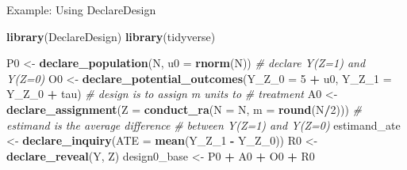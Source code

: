 \documentclass[
  ignorenonframetext,
]{beamer}
\newenvironment{Shaded}{\begin{snugshade}}{\end{snugshade}}
\newcommand{\CommentTok}[1]{\textcolor[rgb]{0.56,0.35,0.01}{\textit{#1}}}
\newcommand{\DataTypeTok}[1]{\textcolor[rgb]{0.13,0.29,0.53}{#1}}
\newcommand{\DecValTok}[1]{\textcolor[rgb]{0.00,0.00,0.81}{#1}}
\newcommand{\KeywordTok}[1]{\textcolor[rgb]{0.13,0.29,0.53}{\textbf{#1}}}
\newcommand{\NormalTok}[1]{#1}
\newcommand{\OperatorTok}[1]{\textcolor[rgb]{0.81,0.36,0.00}{\textbf{#1}}}
\newcommand{\StringTok}[1]{\textcolor[rgb]{0.31,0.60,0.02}{#1}}
\begin{document}
\begin{frame}[fragile]{Example: Using DeclareDesign}
\protect\hypertarget{example-using-declaredesign}{}
\begin{Shaded}
\begin{Highlighting}[]
\KeywordTok{library}\NormalTok{(DeclareDesign)}
\KeywordTok{library}\NormalTok{(tidyverse)}

\NormalTok{P0 \textless{}{-}}\StringTok{ }\KeywordTok{declare\_population}\NormalTok{(N, }\DataTypeTok{u0 =} \KeywordTok{rnorm}\NormalTok{(N))}
\CommentTok{\# declare Y(Z=1) and Y(Z=0)}
\NormalTok{O0 \textless{}{-}}\StringTok{ }\KeywordTok{declare\_potential\_outcomes}\NormalTok{(}\DataTypeTok{Y\_Z\_0 =} \DecValTok{5} \OperatorTok{+}
\StringTok{    }\NormalTok{u0, }\DataTypeTok{Y\_Z\_1 =}\NormalTok{ Y\_Z\_}\DecValTok{0} \OperatorTok{+}\StringTok{ }\NormalTok{tau)}
\CommentTok{\# design is to assign m units to}
\CommentTok{\# treatment}
\NormalTok{A0 \textless{}{-}}\StringTok{ }\KeywordTok{declare\_assignment}\NormalTok{(}\DataTypeTok{Z =} \KeywordTok{conduct\_ra}\NormalTok{(}\DataTypeTok{N =}\NormalTok{ N,}
    \DataTypeTok{m =} \KeywordTok{round}\NormalTok{(N}\OperatorTok{/}\DecValTok{2}\NormalTok{)))}
\CommentTok{\# estimand is the average difference}
\CommentTok{\# between Y(Z=1) and Y(Z=0)}
\NormalTok{estimand\_ate \textless{}{-}}\StringTok{ }\KeywordTok{declare\_inquiry}\NormalTok{(}\DataTypeTok{ATE =} \KeywordTok{mean}\NormalTok{(Y\_Z\_}\DecValTok{1} \OperatorTok{{-}}
\StringTok{    }\NormalTok{Y\_Z\_}\DecValTok{0}\NormalTok{))}
\NormalTok{R0 \textless{}{-}}\StringTok{ }\KeywordTok{declare\_reveal}\NormalTok{(Y, Z)}
\NormalTok{design0\_base \textless{}{-}}\StringTok{ }\NormalTok{P0 }\OperatorTok{+}\StringTok{ }\NormalTok{A0 }\OperatorTok{+}\StringTok{ }\NormalTok{O0 }\OperatorTok{+}\StringTok{ }\NormalTok{R0}
\end{Highlighting}
\end{Shaded}
\end{frame}
\end{document}
